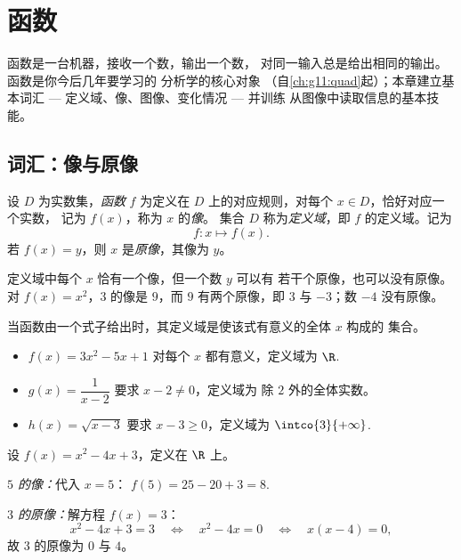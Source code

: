 \chapter{函数}\label{ch:g10:functions}

函数是一台机器，接收一个数，输出一个数，
对同一输入总是给出相同的输出。函数是你今后几年要学习的
分析学的核心对象
（自\cref{ch:g11:quad}起）；本章建立基本词汇 ---
定义域、像、图像、变化情况 --- 并训练
从图像中读取信息的基本技能。

\section{词汇：像与原像}

\begin{definition}[函数]\label{def:g10:functions:function}
设 $D$ 为实数集，\emph{函数} $f$ 为定义在
$D$ 上的对应规则，对每个 $x \in D$，恰好对应一个实数，
记为 $f(x)$，称为 $x$ 的\emph{像}。
集合 $D$ 称为\emph{定义域}，即 $f$ 的定义域。记为
\[
f : x \longmapsto f(x).
\]
若 $f(x) = y$，则 $x$ 是\emph{原像}，其像为 $y$。
\end{definition}

\begin{remark}
定义域中每个 $x$ 恰有一个像，但一个数 $y$ 可以有
若干个原像，也可以没有原像。对 $f(x) = x^2$，$3$ 的像是 $9$，而
$9$ 有两个原像，即 $3$ 与 $-3$；数 $-4$ 没有原像。
\end{remark}

\begin{example}[求定义域]\label{ex:g10:functions:domain}
当函数由一个式子给出时，其定义域是使该式有意义的全体 $x$ 构成的
集合。
\begin{itemize}
  \item $f(x) = 3x^2 - 5x + 1$ 对每个 $x$ 都有意义，定义域为
        $\R$.
  \item $g(x) = \dfrac{1}{x - 2}$ 要求 $x - 2 \neq 0$，定义域为
        除 $2$ 外的全体实数。
  \item $h(x) = \sqrt{x - 3}$ 要求 $x - 3 \geq 0$，定义域为
        $\intco{3}{+\infty}$.
\end{itemize}
\end{example}

\begin{example}[计算像与原像]\label{ex:g10:functions:images}
设 $f(x) = x^2 - 4x + 3$，定义在 $\R$ 上。

\emph{$5$ 的像：}代入 $x = 5$：
$f(5) = 25 - 20 + 3 = 8$.

\emph{$3$ 的原像：}解方程 $f(x) = 3$：
\[
x^2 - 4x + 3 = 3
\quad\Longleftrightarrow\quad
x^2 - 4x = 0
\quad\Longleftrightarrow\quad
x(x - 4) = 0,
\]
故 $3$ 的原像为 $0$ 与 $4$。
\end{example}

